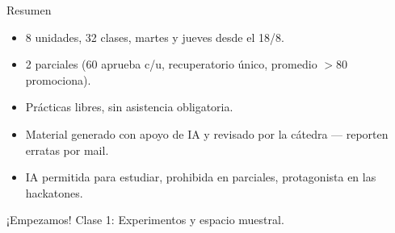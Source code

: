 \documentclass[aspectratio=169,11pt]{beamer}
\begin{document}
\begin{frame}{Resumen}
\begin{itemize}
\item 8 unidades, 32 clases, martes y jueves desde el 18/8.
\item 2 parciales (60 aprueba c/u, recuperatorio único, promedio $>80$ promociona).
\item Prácticas libres, sin asistencia obligatoria.
\item Material generado con apoyo de IA y revisado por la cátedra — reporten erratas por mail.
\item IA permitida para estudiar, prohibida en parciales, protagonista en las hackatones.
\end{itemize}
\vspace{1em}
\begin{center}
\Large ¡Empezamos! Clase 1: Experimentos y espacio muestral.
\end{center}
\end{frame}
\end{document}
